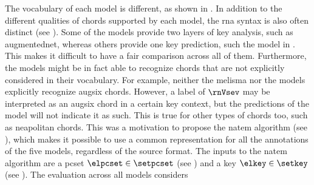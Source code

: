 
The vocabulary of each model is different, as shown in
. In addition to the different
qualities of chords supported by each model, the \gls{rna}
syntax is also often distinct (see
). Some of
the models provide two layers of key analysis, such as
\gls{augmentednet}, whereas others provide one key
prediction, such the model in \textcite{mcleod2021modular}.
This makes it difficult to have a fair comparison across all
of them. Furthermore, the models might be in fact able to
recognize chords that are not explicitly considered in their
vocabulary. For example, neither the \gls{melisma} nor the
\textcite{mcleod2021modular} models explicitly recognize
\gls{augsix} chords. However, a label of $\rnVsev$ may be
interpreted as an \gls{augsix} chord in a certain key
context, but the predictions of the model will not indicate
it as such. This is true for other types of chords too, such
as \gls{neapolitan} chords. This was a motivation to propose
the \gls{natem} algorithm (see
), which
makes it possible to use a common representation for all the
annotations of the five models, regardless of the source
format. The inputs to the \gls{natem} algorithm are a
\gls{pcset} $\elpcset \in \setpcset$ (see
) and a key $\elkey
\in \setkey$ (see ). The
evaluation across all models considers 

